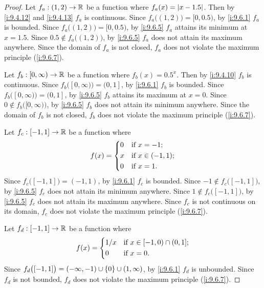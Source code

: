\begin{proof}
  Let \(f_a : (1, 2) \to \mathbb{R}\) be a function where \(f_a(x) = \left\lvert x - 1.5\right\rvert\).
  Then by \cref{i:9.4.12} and \cref{i:9.4.13} \(f_a\) is continuous.
  Since \(f_a\big((1, 2)\big) = [0, 0.5)\), by \cref{i:9.6.1} \(f_a\) is bounded.
  Since \(f_a\big((1, 2)\big) = [0, 0.5)\), by \cref{i:9.6.5} \(f_a\) attains its minimum at \(x = 1.5\).
  Since \(0.5 \notin f_a\big((1, 2)\big)\), by \cref{i:9.6.5} \(f_a\) does not attain its maximum anywhere.
  Since the domain of \(f_a\) is not closed, \(f_a\) does not violate the maximum principle (\cref{i:9.6.7}).

  Let \(f_b : [0, \infty) \to \mathbb{R}\) be a function where \(f_b(x) = 0.5^x\).
  Then by \cref{i:9.4.10} \(f_b\) is continuous.
  Since \(f_b\big([0, \infty)\big) = (0, 1]\), by \cref{i:9.6.1} \(f_b\) is bounded.
  Since \(f_b\big([0, \infty)\big) = (0, 1]\), by \cref{i:9.6.5} \(f_b\) attains its maximum at \(x = 0\).
  Since \(0 \notin f_b\big([0, \infty)\big)\), by \cref{i:9.6.5} \(f_b\) does not attain its minimum anywhere.
  Since the domain of \(f_b\) is not closed, \(f_b\) does not violate the maximum principle (\cref{i:9.6.7}).

  Let \(f_c : [-1, 1] \to \mathbb{R}\) be a function where
  \[
    f(x) = \begin{dcases}
      0 & \text{if } x = -1;        \\
      x & \text{if } x \in (-1, 1); \\
      0 & \text{if } x = 1.
    \end{dcases}
  \]
  Since \(f_c\big([-1, 1]\big) = (-1, 1)\), by \cref{i:9.6.1} \(f_c\) is bounded.
  Since \(-1 \notin f_c\big([-1, 1]\big)\), by \cref{i:9.6.5} \(f_c\) does not attain its minimum anywhere.
  Since \(1 \notin f_c\big([-1, 1]\big)\), by \cref{i:9.6.5} \(f_c\) does not attain its maximum anywhere.
  Since \(f_c\) is not continuous on its domain, \(f_c\) does not violate the maximum principle (\cref{i:9.6.7}).

  Let \(f_d : [-1, 1] \to \mathbb{R}\) be a function where
  \[
    f(x) = \begin{dcases}
      1 / x & \text{if } x \in [-1, 0) \cap (0, 1]; \\
      0     & \text{if } x = 0.
    \end{dcases}
  \]
  Since \(f_d\big([-1, 1]\big) = (-\infty, -1) \cup \left\lbrace0\right\rbrace \cup (1, \infty)\), by \cref{i:9.6.1} \(f_d\) is unbounded.
  Since \(f_d\) is not bounded, \(f_d\) does not violate the maximum principle (\cref{i:9.6.7}).
\end{proof}

